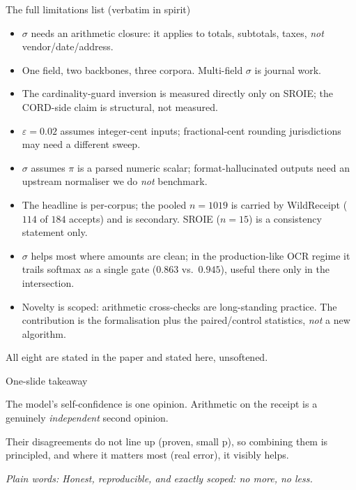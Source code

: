 \documentclass[aspectratio=169]{beamer}
\newcommand{\poolN}{1019}
\newcommand{\bigq}[1]{\begin{center}{\Large #1}\end{center}}
\newcommand{\keybox}[1]{\begin{center}\colorbox{grey!15}{\parbox{0.92\linewidth}{\centering #1}}\end{center}}
\newcommand{\plain}[1]{\textit{\textcolor{sig}{Plain words:} #1}}
\begin{document}
\begin{frame}{The full limitations list (verbatim in spirit)}
\scriptsize
\begin{itemize}
\item[(i)] $\sigma$ needs an arithmetic closure: it applies to
totals, subtotals, taxes, \emph{not} vendor/date/address.
\item[(ii)] One field, two backbones, three corpora. Multi-field
$\sigma$ is journal work.
\item[(iii)] The cardinality-guard inversion is measured directly
only on SROIE; the CORD-side claim is structural, not measured.
\item[(iv)] $\varepsilon{=}0.02$ assumes integer-cent inputs;
fractional-cent rounding jurisdictions may need a different sweep.
\item[(v)] $\sigma$ assumes $\pi$ is a parsed numeric scalar;
format-hallucinated outputs need an upstream normaliser we do
\emph{not} benchmark.
\item[(vi)] The headline is per-corpus; the pooled $n{=}\poolN$ is
carried by WildReceipt ($114$ of $184$ accepts) and is secondary.
SROIE ($n{=}15$) is a consistency statement only.
\item[(vii)] $\sigma$ helps most where amounts are clean; in the
production-like OCR regime it trails softmax as a single gate
($0.863$ vs.\ $0.945$), useful there only in the intersection.
\item[(viii)] Novelty is scoped: arithmetic cross-checks are
long-standing practice. The contribution is the formalisation plus
the paired/control statistics, \emph{not} a new algorithm.
\end{itemize}
\keybox{All eight are stated in the paper and stated here, unsoftened.}
\end{frame}

\begin{frame}{One-slide takeaway}
\bigq{The model's self-confidence is one opinion. Arithmetic on the
receipt is a genuinely \emph{independent} second opinion.}
\vspace{0.8em}
\bigq{Their disagreements do not line up (proven, small p), so
combining them is principled, and where it matters most (real error),
it visibly helps.}
\vspace{0.8em}
\plain{Honest, reproducible, and exactly scoped: no more, no less.}
\end{frame}
\end{document}
